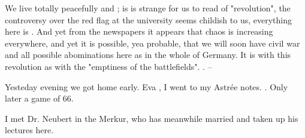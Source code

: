 
We live totally peacefully and ; is is strange for us to read of "revolution", the controversy over the red flag at the university seems childish to us, everything here is . And yet from the newspapers it appears that chaos is increasing everywhere, and yet it is possible, yea probable, that we will soon have civil war and all possible abominations here as in the whole of Germany. It is with this revolution as with the "emptiness of the battlefields". . --

Yesteday evening we got home early. Eva , I went to my Astrée notes. . Only later a game of 66.

\missing

I met Dr. Neubert in the Merkur, who has meanwhile married and taken up his lectures here.

\missing

